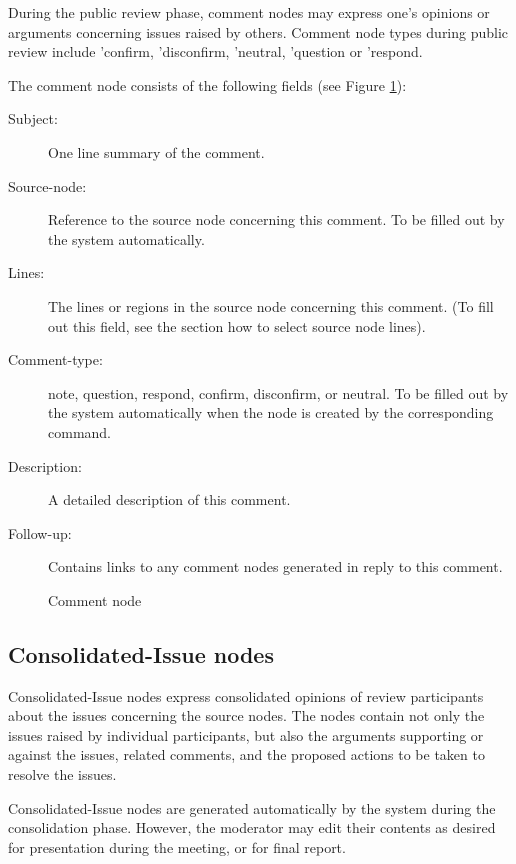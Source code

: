 During the public review phase, comment nodes may express one's opinions
or arguments concerning issues raised by others. 
Comment node types  during public review include
'confirm, 'disconfirm, 'neutral, 'question or 'respond.

\noindent The comment node consists of the following fields (see Figure
\ref{comment}):
\begin{description}
\item [Subject:] One line summary of the comment.
\item [Source-node:] Reference to the source node concerning this comment.
To be filled out by the system automatically.
\item [Lines:]  The lines or regions in the source node concerning
this comment. (To fill out this field, see the section how to
select source node lines). 
\item [Comment-type:] note, question, respond, confirm, disconfirm, or
neutral. To be filled out by the system automatically when the node is
created by the corresponding command.
\item [Description:] A detailed description of this comment.
\item [Follow-up:] Contains links to any comment nodes generated in
reply to this comment.
\end{description}

\begin{figure}[htpb]
  {\centerline{}}
  \caption{Comment node}
  \label{comment}
\end{figure}

\subsection {Consolidated-Issue nodes}
Consolidated-Issue nodes express consolidated opinions of review participants
about the issues concerning the source nodes. The nodes contain not only
the issues raised by individual participants, but also the arguments 
supporting or against the issues, related comments, and the proposed
actions to be taken to resolve the issues.

Consolidated-Issue nodes are generated automatically by the system during
the consolidation phase. However, the moderator may edit their contents as 
desired for presentation during the meeting, or for final report.

